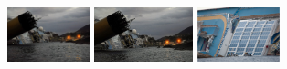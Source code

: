 \documentclass{acm_proc_article-sp}
\newcommand{\thumbheight}{16mm}
\newenvironment{thumbsequence}{}{\makebox[4mm]{}}
\begin{document}
\begin{figure}
\begin{centering}
	\begin{thumbsequence}
		\includegraphics[height=\thumbheight]{resources/concordia/looseduplicate1.jpg}
		\includegraphics[height=\thumbheight]{resources/concordia/looseduplicate2.jpg}
	\end{thumbsequence}
	\begin{thumbsequence}
		\includegraphics[height=\thumbheight]{resources/concordia/looseduplicate3.jpg}

\end{thumbsequence}
\end{centering}
\end{figure}
\end{document}
